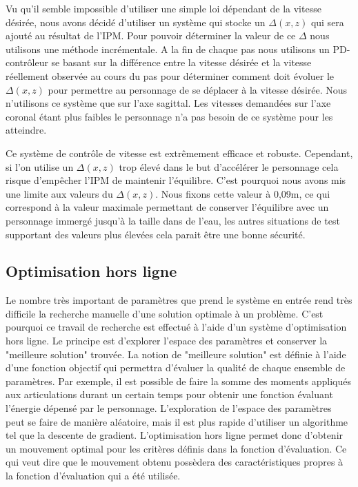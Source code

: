 \documentclass[runningheads,a4paper]{llncs}
\begin{document}
Vu qu'il semble impossible d'utiliser une simple loi dépendant de la vitesse désirée, nous avons décidé d'utiliser un système qui stocke un $\Delta(x,z)$ qui sera ajouté au résultat de l'IPM. Pour pouvoir déterminer la valeur de ce $\Delta$ nous utilisons une méthode incrémentale. A la fin de chaque pas nous utilisons un PD-contrôleur se basant sur la différence entre la vitesse désirée et la vitesse réellement observée au cours du pas pour déterminer comment doit évoluer le $\Delta(x,z)$ pour permettre au personnage de se déplacer à la vitesse désirée. Nous n'utilisons ce système que sur l'axe sagittal. Les vitesses demandées sur l'axe coronal étant plus faibles le personnage n'a pas besoin de ce système pour les atteindre.

Ce système de contrôle de vitesse est extrêmement efficace et robuste. Cependant, si l'on utilise un $\Delta(x,z)$ trop élevé dans le but d'accélérer le personnage cela risque d'empêcher l'IPM de maintenir l'équilibre. C'est pourquoi nous avons mis une limite aux valeurs du $\Delta(x,z)$. Nous fixons cette valeur à 0,09m, ce qui correspond à la valeur maximale permettant de conserver l'équilibre avec un personnage immergé jusqu'à la taille dans de l'eau, les autres situations de test supportant des valeurs plus élevées cela parait être une bonne sécurité. 
%

\subsection{Optimisation hors ligne}
%
Le nombre très important de paramètres que prend le système en entrée rend très difficile la recherche manuelle d'une solution optimale à un problème. C'est pourquoi ce travail de recherche est effectué à l'aide d'un système d'optimisation hors ligne. Le principe est d'explorer l'espace des paramètres et conserver la "meilleure solution" trouvée. La notion de "meilleure solution"  est définie à l'aide d'une fonction objectif qui permettra d'évaluer la qualité de chaque ensemble de paramètres. Par exemple, il est possible de faire la somme des moments appliqués aux articulations durant un certain temps pour obtenir une fonction évaluant l'énergie dépensé par le personnage. L'exploration de l'espace des paramètres peut se faire de manière aléatoire, mais il est plus rapide d'utiliser un algorithme tel que la descente de gradient. L'optimisation hors ligne permet donc d'obtenir un mouvement optimal pour les critères définis dans la fonction d'évaluation. Ce qui veut dire que le mouvement obtenu possèdera des caractéristiques propres à la fonction d'évaluation qui a été utilisée.
\end{document}
